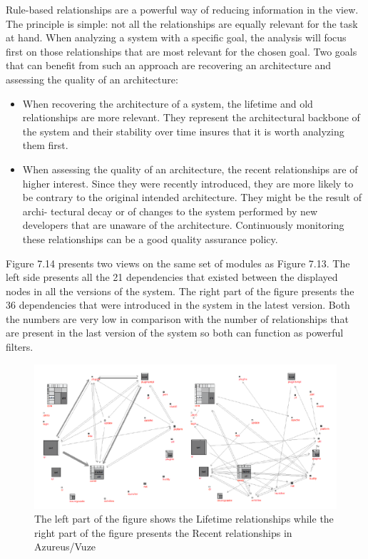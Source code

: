\documentclass[preprint,12pt]{elsarticle}
\begin{document}
Rule-based relationships are a powerful way of reducing information in the view. The principle is simple: not all the relationships are equally relevant for the task at hand. When analyzing a system with a specific goal, the analysis will focus first on those relationships that are most relevant for the chosen goal. Two goals that can benefit from such an approach are recovering an architecture and assessing the quality of an architecture:

\begin{itemize}
\item When recovering the architecture of a system, the lifetime and old relationships are more relevant. They represent the architectural backbone of the system and their stability over time insures that it is worth analyzing them first.

\item When assessing the quality of an architecture, the recent relationships are of higher interest. Since they were recently introduced, they are more likely to be contrary to the original intended architecture. They might be the result of archi- tectural decay or of changes to the system performed by new developers that are unaware of the architecture. Continuously monitoring these relationships can be a good quality assurance policy.
\end{itemize}

Figure 7.14 presents two views on the same set of modules as Figure 7.13. The left side presents all the 21 dependencies that existed between the displayed nodes in all the versions of the system. The right part of the figure presents the 36 dependencies that were introduced in the system in the latest version. Both the numbers are very low in comparison with the number of relationships that are present in the last version of the system so both can function as powerful filters.

\begin{figure}[h]
\begin{center}
\includegraphics[width=\linewidth]{images/Architecture-LifetimeVsRecent}
\caption{The left part of the figure shows the Lifetime relationships while the right part of the figure presents the Recent relationships in Azureus/Vuze}
\label{}
\end{center}
\end{figure}
\end{document}
